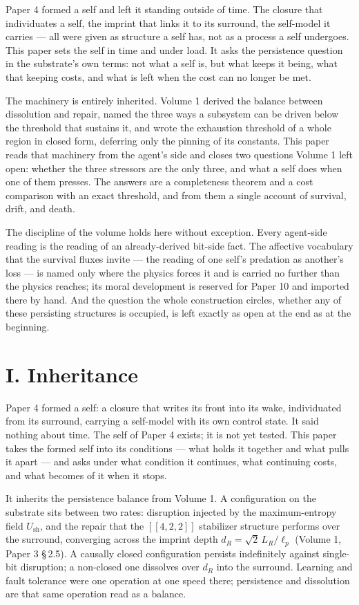 \documentclass[11pt,oneside]{report}
\theoremstyle{definition}
\theoremstyle{remark}
\begin{document}
Paper 4 formed a self and left it standing outside of time. The closure that individuates a self, the imprint that links it to its surround, the self-model it carries --- all were given as structure a self has, not as a process a self undergoes. This paper sets the self in time and under load. It asks the persistence question in the substrate's own terms: not what a self is, but what keeps it being, what that keeping costs, and what is left when the cost can no longer be met.

The machinery is entirely inherited. Volume 1 derived the balance between dissolution and repair, named the three ways a subsystem can be driven below the threshold that sustains it, and wrote the exhaustion threshold of a whole region in closed form, deferring only the pinning of its constants. This paper reads that machinery from the agent's side and closes two questions Volume 1 left open: whether the three stressors are the only three, and what a self does when one of them presses. The answers are a completeness theorem and a cost comparison with an exact threshold, and from them a single account of survival, drift, and death.

The discipline of the volume holds here without exception. Every agent-side reading is the reading of an already-derived bit-side fact. The affective vocabulary that the survival fluxes invite --- the reading of one self's predation as another's loss --- is named only where the physics forces it and is carried no further than the physics reaches; its moral development is reserved for Paper 10 and imported there by hand. And the question the whole construction circles, whether any of these persisting structures is occupied, is left exactly as open at the end as at the beginning.

\section*{I. Inheritance}

Paper 4 formed a self: a closure that writes its front into its wake, individuated from its surround, carrying a self-model with its own control state. It said nothing about time. The self of Paper 4 exists; it is not yet tested. This paper takes the formed self into its conditions --- what holds it together and what pulls it apart --- and asks under what condition it continues, what continuing costs, and what becomes of it when it stops.

It inherits the persistence balance from Volume 1. A configuration on the substrate sits between two rates: disruption injected by the maximum-entropy field \ensuremath{U_{\mathrm{sh}}}, and the repair that the \ensuremath{[[4,2,2]]} stabilizer structure performs over the surround, converging across the imprint depth \ensuremath{d_R = \sqrt{2}\,L_R/\ell_p} (Volume 1, Paper 3 \S\,2.5). A causally closed configuration persists indefinitely against single-bit disruption; a non-closed one dissolves over \ensuremath{d_R} into the surround. Learning and fault tolerance were one operation at one speed there; persistence and dissolution are that same operation read as a balance.
\end{document}
